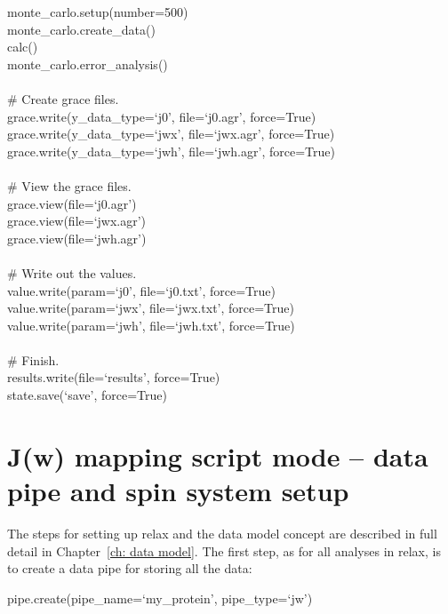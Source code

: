 \begin{exampleenv}
monte\_carlo.setup(number=500) \\
monte\_carlo.create\_data() \\
calc() \\
monte\_carlo.error\_analysis() \\
 \\
\# Create grace files. \\
grace.write(y\_data\_type=`j0', file=`j0.agr', force=True) \\
grace.write(y\_data\_type=`jwx', file=`jwx.agr', force=True) \\
grace.write(y\_data\_type=`jwh', file=`jwh.agr', force=True) \\
 \\
\# View the grace files. \\
grace.view(file=`j0.agr') \\
grace.view(file=`jwx.agr') \\
grace.view(file=`jwh.agr') \\
 \\
\# Write out the values. \\
value.write(param=`j0', file=`j0.txt', force=True) \\
value.write(param=`jwx', file=`jwx.txt', force=True) \\
value.write(param=`jwh', file=`jwh.txt', force=True) \\
 \\
\# Finish. \\
results.write(file=`results', force=True) \\
state.save(`save', force=True)
\end{exampleenv}




\section{J(w) mapping script mode -- data pipe and spin system setup}

The steps for setting up relax and the data model concept are described in full detail in Chapter~\ref{ch: data model}.  The first step, as for all analyses in relax, is to create a data pipe for storing all the data:

\begin{exampleenv}
pipe.create(pipe\_name=`my\_protein', pipe\_type=`jw')
\end{exampleenv}

